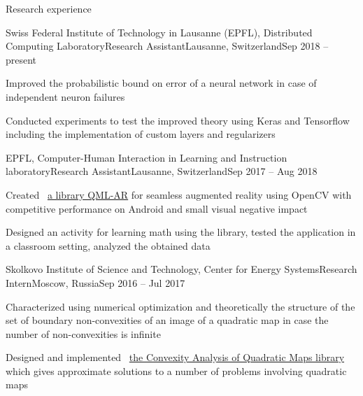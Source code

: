 \documentclass{resume} %
\begin{document}
\begin{rSection}{Research experience}

	\begin{rSubsection}{Swiss Federal Institute of Technology in Lausanne (EPFL), Distributed Computing Laboratory}{Research Assistant}{Lausanne, Switzerland}{Sep 2018 -- present}
		\item Improved the probabilistic bound on error of a neural network in case of independent neuron failures
		\item Conducted experiments to test the improved theory using Keras and Tensorflow including the implementation of custom layers and regularizers
	\end{rSubsection}

	\begin{rSubsection}{EPFL, Computer-Human Interaction in Learning and Instruction laboratory}{Research Assistant}{Lausanne, Switzerland}{Sep 2017 -- Aug 2018}
		\item Created \faExternalLink~\href{https://github.com/chili-epfl/qml-ar}{a library QML-AR} for seamless augmented reality using OpenCV with competitive performance on Android and small visual negative impact
		\item Designed an activity for learning math using the library, tested the application in a classroom setting, analyzed the obtained data
	\end{rSubsection}
	
	\begin{rSubsection}{Skolkovo Institute of Science and Technology, Center for Energy Systems}{Research Intern}{Moscow, Russia}{Sep 2016 -- Jul 2017}
		\item Characterized using numerical optimization and theoretically the structure of the set of boundary non-convexities of an image of a quadratic map in case the number of non-convexities is infinite
		\item Designed and implemented \faExternalLink~\href{https://github.com/sergeivolodin/CAQM}{the Convexity Analysis of Quadratic Maps library} which gives approximate solutions to a number of problems involving quadratic maps
	\end{rSubsection}
	
	

\end{rSection}
\end{document}
